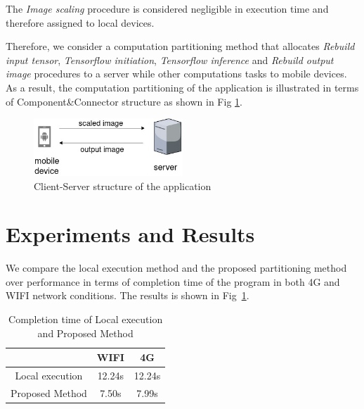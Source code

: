 \documentclass[a4paper,11pt,onecolumn,twoside]{article}
\begin{document}
\begin{CJK*}{GBK}{song}
The \textit{Image scaling} procedure is considered negligible
in execution time
and therefore assigned to local devices.

Therefore, we consider a computation partitioning method that
allocates \textit{Rebuild input tensor}, 
\textit{Tensorflow initiation}, \textit{Tensorflow inference} 
and \textit{Rebuild output image} procedures 
to a server while other computations tasks to mobile devices.
As a result, the computation partitioning 
of the application is illustrated in
terms of Component\&Connector structure
 as shown in Fig \ref{fig:C&C}.

\begin{figure}[!htb] %
  \centering %
  \includegraphics[width=0.5\textwidth]{partition} %
  \caption{Client-Server structure of the application} %
  \label{fig:C&C} %
\end{figure}

\section{Experiments and Results}

We compare the local execution method and the proposed 
partitioning method 
over performance in terms of completion time of the program
in both 4G and WIFI network conditions. 
The results is shown in Fig~\ref{tb:result}. 

\begin{table}[!hbt]
  \caption{Completion time of Local execution and Proposed Method}
  \centering\label{tb:result}
  \begin{tabular}{|c|c|c|}
  \hline
                                       & WIFI                & 4G              \\ \hline
  Local execution                      &  12.24s             &  12.24s         \\ \hline
  Proposed Method                     &  7.50s              &  7.99s          \\ \hline
  \end{tabular}
  \end{table}


\end{CJK*}
\end{document}
